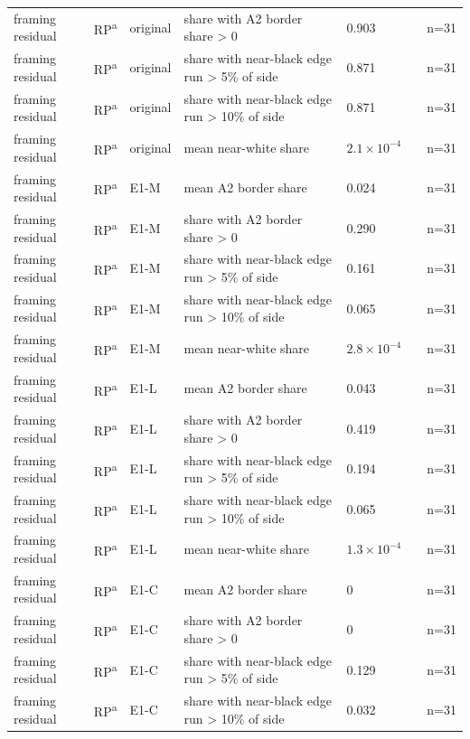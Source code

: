 \begin{longtable}{@{}p{3.3cm}lp{1.5cm}p{3.6cm}p{2.2cm}p{1.6cm}p{3.2cm}@{}}
framing residual & RP\textsuperscript{a} & original & share with A2 border share > 0 & 0.903 &  & n=31 \\
framing residual & RP\textsuperscript{a} & original & share with near-black edge run > 5\% of side & 0.871 &  & n=31 \\
framing residual & RP\textsuperscript{a} & original & share with near-black edge run > 10\% of side & 0.871 &  & n=31 \\
framing residual & RP\textsuperscript{a} & original & mean near-white share & $2.1\times10^{-4}$ &  & n=31 \\
framing residual & RP\textsuperscript{a} & E1-M & mean A2 border share & 0.024 &  & n=31 \\
framing residual & RP\textsuperscript{a} & E1-M & share with A2 border share > 0 & 0.290 &  & n=31 \\
framing residual & RP\textsuperscript{a} & E1-M & share with near-black edge run > 5\% of side & 0.161 &  & n=31 \\
framing residual & RP\textsuperscript{a} & E1-M & share with near-black edge run > 10\% of side & 0.065 &  & n=31 \\
framing residual & RP\textsuperscript{a} & E1-M & mean near-white share & $2.8\times10^{-4}$ &  & n=31 \\
framing residual & RP\textsuperscript{a} & E1-L & mean A2 border share & 0.043 &  & n=31 \\
framing residual & RP\textsuperscript{a} & E1-L & share with A2 border share > 0 & 0.419 &  & n=31 \\
framing residual & RP\textsuperscript{a} & E1-L & share with near-black edge run > 5\% of side & 0.194 &  & n=31 \\
framing residual & RP\textsuperscript{a} & E1-L & share with near-black edge run > 10\% of side & 0.065 &  & n=31 \\
framing residual & RP\textsuperscript{a} & E1-L & mean near-white share & $1.3\times10^{-4}$ &  & n=31 \\
framing residual & RP\textsuperscript{a} & E1-C & mean A2 border share & 0 &  & n=31 \\
framing residual & RP\textsuperscript{a} & E1-C & share with A2 border share > 0 & 0 &  & n=31 \\
framing residual & RP\textsuperscript{a} & E1-C & share with near-black edge run > 5\% of side & 0.129 &  & n=31 \\
framing residual & RP\textsuperscript{a} & E1-C & share with near-black edge run > 10\% of side & 0.032 &  & n=31 \\

\end{longtable}
